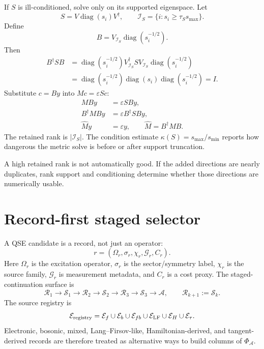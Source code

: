\documentclass[10pt,twocolumn]{article}
\newcommand{\Acal}{\mathcal A}
\newcommand{\Ecal}{\mathcal E}
\newcommand{\Rcal}{\mathcal R}
\newcommand{\Scal}{\mathcal S}
\newcommand{\Gcal}{\mathcal G}
\newcommand{\Ical}{\mathcal I}
\newcommand{\lf}{\mathrm{LF}}
\newcommand{\diag}{\operatorname{diag}}
\begin{document}
If \(S\) is ill-conditioned, solve only on its supported eigenspace. Let
\begin{equation}
S=V\diag(s_i)V^\dagger,
\qquad
\Ical_S=\{i:s_i\ge \tau_Ss_{\max}\}.
\label{eq:S_eigs}
\end{equation}
Define
\begin{equation}
B=V_{\Ical_S}\diag(s_i^{-1/2}).
\label{eq:B_def}
\end{equation}
Then
\begin{equation}
\begin{aligned}
B^\dagger SB
&=\diag(s_i^{-1/2})V_{\Ical_S}^\dagger SV_{\Ical_S}\diag(s_i^{-1/2})\\
&=\diag(s_i^{-1/2})\diag(s_i)\diag(s_i^{-1/2})=I.
\end{aligned}
\label{eq:B_whitens}
\end{equation}
Substitute \(c=By\) into \(Mc=\varepsilon Sc\):
\begin{equation}
\begin{aligned}
MBy&=\varepsilon SBy,\\
B^\dagger MBy&=\varepsilon B^\dagger SBy,\\
\widehat M y&=\varepsilon y,
\qquad
\widehat M=B^\dagger MB.
\end{aligned}
\label{eq:whitened_gep}
\end{equation}
The retained rank is \(|\Ical_S|\). The condition estimate \(\kappa(S)=s_{\max}/s_{\min}\) reports how dangerous the metric solve is before or after support truncation.

\begin{cautionbox}
A high retained rank is not automatically good. If the added directions are nearly duplicates, rank support and conditioning determine whether those directions are numerically usable.
\end{cautionbox}

\section{Record-first staged selector}

A QSE candidate is a record, not just an operator:
\begin{equation}
r=(\Omega_r,\sigma_r,\chi_r,\Gcal_r,C_r).
\label{eq:record_tuple}
\end{equation}
Here \(\Omega_r\) is the excitation operator, \(\sigma_r\) is the sector/symmetry label, \(\chi_r\) is the source family, \(\Gcal_r\) is measurement metadata, and \(C_r\) is a cost proxy. The staged-continuation surface is
\begin{equation}
\Rcal_1\to\Scal_1\to\Rcal_2\to\Scal_2\to\Rcal_3\to\Scal_3\to\Acal,
\qquad
\Rcal_{k+1}:=\Scal_k.
\label{eq:record_flow}
\end{equation}
The source registry is
\begin{equation}
\Ecal_{\rm registry}=\Ecal_f\cup\Ecal_b\cup\Ecal_{fb}\cup\Ecal_{\lf}\cup\Ecal_H\cup\Ecal_\tau.
\label{eq:registry}
\end{equation}
Electronic, bosonic, mixed, Lang--Firsov-like, Hamiltonian-derived, and tangent-derived records are therefore treated as alternative ways to build columns of \(\Phi_\Acal\).
\end{document}
